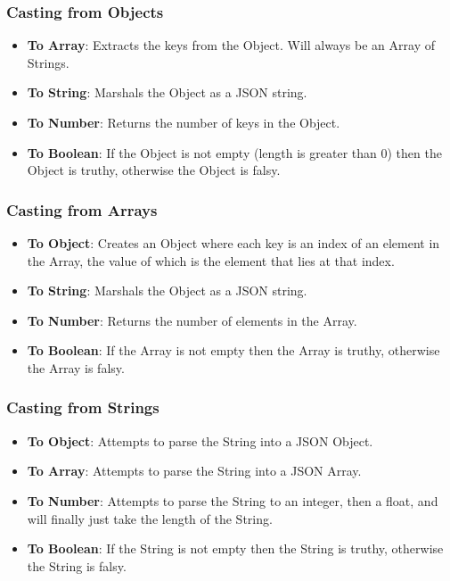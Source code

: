 \documentclass[]{full}
\theoremstyle{definition}
\begin{document}
\subsubsection{Casting from Objects}

\begin{itemize}
    \item \textbf{To Array}: Extracts the keys from the Object. Will always be an Array of Strings.
    \item \textbf{To String}: Marshals the Object as a JSON string.
    \item \textbf{To Number}: Returns the number of keys in the Object.
    \item \textbf{To Boolean}: If the Object is not empty (length is greater than 0) then the Object is truthy, otherwise the Object is falsy.
\end{itemize}

\subsubsection{Casting from Arrays}

\begin{itemize}
    \item \textbf{To Object}: Creates an Object where each key is an index of an element in the Array, the value of which is the element that lies at that index.
    \item \textbf{To String}: Marshals the Object as a JSON string.
    \item \textbf{To Number}: Returns the number of elements in the Array.
    \item \textbf{To Boolean}: If the Array is not empty then the Array is truthy, otherwise the Array is falsy.
\end{itemize}

\subsubsection{Casting from Strings}

\begin{itemize}
    \item \textbf{To Object}: Attempts to parse the String into a JSON Object.
    \item \textbf{To Array}: Attempts to parse the String into a JSON Array.
    \item \textbf{To Number}: Attempts to parse the String to an integer, then a float, and will finally just take the length of the String.
    \item \textbf{To Boolean}: If the String is not empty then the String is truthy, otherwise the String is falsy.
\end{itemize}
\end{document}
